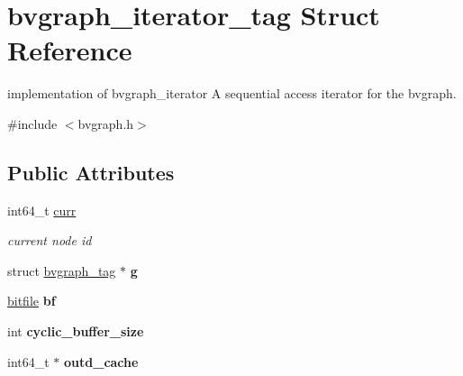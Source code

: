 \hypertarget{structbvgraph__iterator__tag}{\section{bvgraph\+\_\+iterator\+\_\+tag Struct Reference}
\label{structbvgraph__iterator__tag}
}


implementation of bvgraph\+\_\+iterator A sequential access iterator for the bvgraph.  




{\ttfamily \#include $<$bvgraph.\+h$>$}

\subsection*{Public Attributes}
\begin{DoxyCompactItemize}
\item 
\hypertarget{structbvgraph__iterator__tag_af7df321c239b483e83f01fe53e94c35d}{int64\+\_\+t \hyperlink{structbvgraph__iterator__tag_af7df321c239b483e83f01fe53e94c35d}{curr}}\label{structbvgraph__iterator__tag_af7df321c239b483e83f01fe53e94c35d}

\begin{DoxyCompactList}\small\item\em current node id \end{DoxyCompactList}\item 
\hypertarget{structbvgraph__iterator__tag_aa5768c7ffac000ac352091adc30cf679}{struct \hyperlink{structbvgraph__tag}{bvgraph\+\_\+tag} $\ast$ {\bfseries g}}\label{structbvgraph__iterator__tag_aa5768c7ffac000ac352091adc30cf679}

\item 
\hypertarget{structbvgraph__iterator__tag_a4b521fcadd149bd05cbf42f318e9a473}{\hyperlink{structbitfile__tag}{bitfile} {\bfseries bf}}\label{structbvgraph__iterator__tag_a4b521fcadd149bd05cbf42f318e9a473}

\item 
\hypertarget{structbvgraph__iterator__tag_ab79daef38ecf1b3f272b4e7de9260d24}{int {\bfseries cyclic\+\_\+buffer\+\_\+size}}\label{structbvgraph__iterator__tag_ab79daef38ecf1b3f272b4e7de9260d24}

\item 
\hypertarget{structbvgraph__iterator__tag_a1fba91eeb5d90e45c0633c269032aa91}{int64\+\_\+t $\ast$ {\bfseries outd\+\_\+cache}}\label{structbvgraph__iterator__tag_a1fba91eeb5d90e45c0633c269032aa91}


\end{DoxyCompactItemize}
